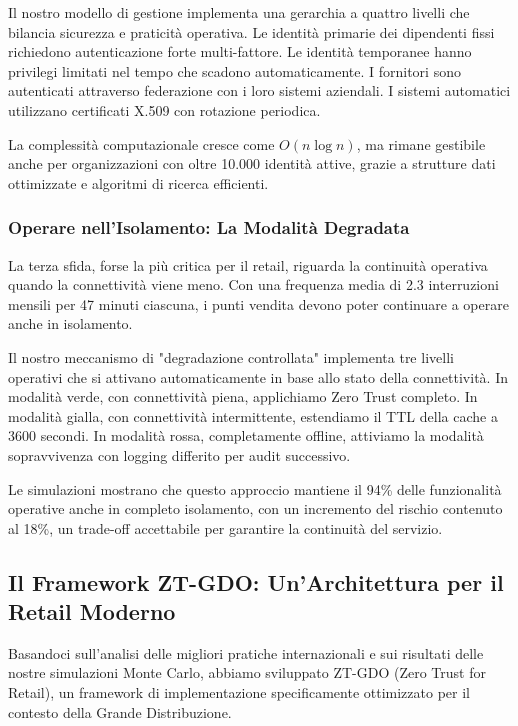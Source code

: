 Il nostro modello di gestione implementa una gerarchia a quattro livelli che bilancia sicurezza e praticità operativa. Le identità primarie dei dipendenti fissi richiedono autenticazione forte multi-fattore. Le identità temporanee hanno privilegi limitati nel tempo che scadono automaticamente. I fornitori sono autenticati attraverso federazione con i loro sistemi aziendali. I sistemi automatici utilizzano certificati X.509 con rotazione periodica.

La complessità computazionale cresce come $O(n \log n)$, ma rimane gestibile anche per organizzazioni con oltre 10.000 identità attive, grazie a strutture dati ottimizzate e algoritmi di ricerca efficienti.

\subsubsection{Operare nell'Isolamento: La Modalità Degradata}

La terza sfida, forse la più critica per il retail, riguarda la continuità operativa quando la connettività viene meno. Con una frequenza media di 2.3 interruzioni mensili per 47 minuti ciascuna, i punti vendita devono poter continuare a operare anche in isolamento.

Il nostro meccanismo di "degradazione controllata" implementa tre livelli operativi che si attivano automaticamente in base allo stato della connettività. In modalità verde, con connettività piena, applichiamo Zero Trust completo. In modalità gialla, con connettività intermittente, estendiamo il TTL della cache a 3600 secondi. In modalità rossa, completamente offline, attiviamo la modalità sopravvivenza con logging differito per audit successivo.

Le simulazioni mostrano che questo approccio mantiene il 94\% delle funzionalità operative anche in completo isolamento, con un incremento del rischio contenuto al 18\%, un trade-off accettabile per garantire la continuità del servizio.

\subsection{Il Framework ZT-GDO: Un'Architettura per il Retail Moderno}

Basandoci sull'analisi delle migliori pratiche internazionali e sui risultati delle nostre simulazioni Monte Carlo, abbiamo sviluppato ZT-GDO (Zero Trust for Retail), un framework di implementazione specificamente ottimizzato per il contesto della Grande Distribuzione.

